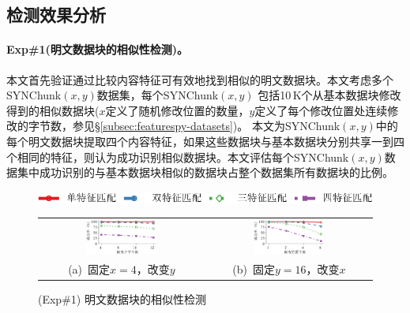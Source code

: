 \subsection{检测效果分析}
\label{subsec:featurespy-evaluation-detection}

\paragraph*{Exp\#1(明文数据块的相似性检测)。}本文首先验证通过比较内容特征可有效地找到相似的明文数据块。本文考虑多个SYNChunk$(x, y)$数据集，每个SYNChunk$(x, y)$ 包括10\,K个从基本数据块修改得到的相似数据块($x$定义了随机修改位置的数量，$y$定义了每个修改位置处连续修改的字节数，参见\S\ref{subsec:featurespy-datasets})。 本文为SYNChunk$(x, y)$中的每个明文数据块提取四个内容特征，如果这些数据块与基本数据块分别共享一到四个相同的特征，则认为成功识别相似数据块。本文评估每个SYNChunk$(x, y)$数据集中成功识别的与基本数据块相似的数据块占整个数据集所有数据块的比例。

\begin{figure}[!htb]
    \centering
    \includegraphics[height=10.5pt]{pic/featurespy/plot/detection/syn/fixed_pq_legend.pdf}
    \vspace{5pt}\\
    \begin{tabular}{@{\ }c@{\ }c}
        \includegraphics[width=0.45\textwidth]{pic/featurespy/plot/detection/syn/fixed_p_4.pdf} &
        \includegraphics[width=0.45\textwidth]{pic/featurespy/plot/detection/syn/fixed_q_16.pdf}  \\
        \mbox{\small (a) 固定$x=4$，改变$y$}                                                    &
        \mbox{\small (b) 固定$y=16$，改变$x$}                                                     \\
    \end{tabular}
    \caption{(Exp\#1) 明文数据块的相似性检测}
    \label{fig:featurespy-expDetectionSynSim}
\end{figure}

